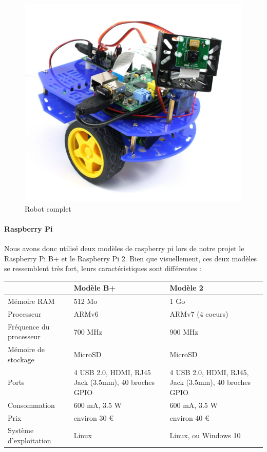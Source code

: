 \documentclass[12pt,a4paper]{report}
\begin{document}
\begin{figure}[hf!]
\center
\includegraphics[scale=0.2]{images/kit.jpg}
\caption{Robot complet}
\end{figure}

\paragraph{Raspberry Pi} Nous avons donc utilisé deux modèles de raspberry pi lors de notre projet le Raspberry Pi B+ et le Raspberry Pi 2. 
Bien que visuellement, ces deux modèles se ressemblent très fort, leurs caractéristiques sont différentes :

\begin{tabular}{l|p{4.5 cm}|p{4.5 cm}}
 & Modèle B+ & Modèle 2 \\ 
\hline 
Mémoire RAM & 512 Mo & 1 Go \\ 
Processeur & ARMv6 & ARMv7 (4 coeurs) \\
Fréquence du processeur & 700 MHz & 900 MHz \\
Mémoire de stockage & MicroSD & MicroSD \\
Ports & 4 USB 2.0, HDMI, RJ45 \newline Jack (3.5mm), 40 broches GPIO & 4 USB 2.0, HDMI, RJ45, Jack (3.5mm), 40 broches GPIO \\
Consommation & 600 mA, 3.5 W & 600 mA, 3.5 W \\
Prix & environ 30 \euro & environ 40 \euro \\
Système d'exploitation & Linux & Linux, ou Windows 10
\end{tabular}
\end{document}

